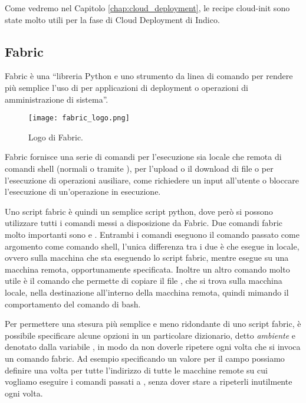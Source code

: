             Come vedremo nel Capitolo \ref{chap:cloud_deployment}, le recipe cloud-init sono state molto utili per la fase di Cloud Deployment di Indico.
                    
        \subsection{Fabric} \label{subsec:p;sl;fabric}
        
            Fabric è una ``libreria Python e uno strumento da linea di comando per rendere più semplice l'uso di  per applicazioni di deployment o operazioni di amministrazione di sistema''. \cite{fabric:documentation}
            
        	\begin{figure}[h!]
        		\begin{center}
        			\texttt{[image: fabric\_logo.png]}
        		\end{center}
        		\caption[Logo di Fabric]{Logo di Fabric.}
        		\label{fig:fabric_logo}
        	\end{figure}
            
            Fabric fornisce una serie di comandi per l'esecuzione sia locale che remota di comandi shell (normali o tramite ), per l'upload o il download di file o per l'esecuzione di operazioni ausiliare, come richiedere un input all'utente o bloccare l'esecuzione di un'operazione in esecuzione.
            
            Uno script fabric è quindi un semplice script python, dove però si possono utilizzare tutti i comandi messi a disposizione da Fabric. Due comandi fabric molto importanti sono  e . Entrambi i comandi eseguono il comando  passato come argomento come comando shell, l'unica differenza tra i due è che  esegue  in locale, ovvero sulla macchina che sta eseguendo lo script fabric, mentre  esegue  su una macchina remota, opportunamente specificata. Inoltre un altro comando molto utile è il comando  che permette di copiare il file , che si trova sulla macchina locale, nella destinazione  all'interno della macchina remota, quindi mimando il comportamento del comando  di bash.
            
            Per permettere una stesura più semplice e meno ridondante di uno script fabric, è possibile specificare alcune opzioni in un particolare dizionario, detto \textit{ambiente} e denotato dalla variabile , in modo da non doverle ripetere ogni volta che si invoca un comando fabric. Ad esempio specificando un valore per il campo  possiamo definire una volta per tutte l'indirizzo di tutte le macchine remote su cui vogliamo eseguire i comandi passati a , senza dover stare a ripeterli inutilmente ogni volta.
            
